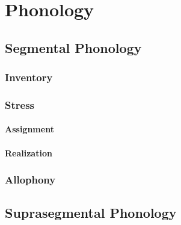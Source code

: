 \part{Phonology}

\chapter{Segmental Phonology}
\section{Inventory}
\section{Stress}
\subsection{Assignment}
\subsection{Realization}
\section{Allophony}
\chapter{Suprasegmental Phonology}